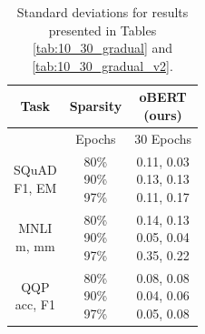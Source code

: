 \documentclass[11pt]{article}
\begin{document}
\begin{table}[htb!]
      \centering
         {\small 
             \begin{tabular}{cc|c}
                \toprule 
                Task & Sparsity & \makecell{oBERT\\ (ours)}\\
                \midrule
                  & Epochs & 30 Epochs\\
                \midrule
                \makecell{SQuAD\\ F1, EM} & \makecell{80\% \\ 90\% \\ 97\%} & \makecell{0.11, 0.03 \\ 0.13, 0.13 \\ 0.11, 0.17}\\
                \midrule
                \makecell{MNLI\\m, mm} & \makecell{80\% \\ 90\% \\ 97\%} & \makecell{0.14, 0.13 \\ 0.05, 0.04 \\ 0.35, 0.22}\\
                \midrule
                \makecell{QQP\\ acc, F1} &  \makecell{80\% \\ 90\% \\ 97\%} & \makecell{0.08, 0.08 \\ 0.04, 0.06 \\ 0.05, 0.08}\\
                \bottomrule
            \end{tabular}
         }
     \caption{Standard deviations for results presented in Tables \ref{tab:10_30_gradual} and \ref{tab:10_30_gradual_v2}.}
    \label{tab:10_30_gradual_stdev}
\end{table}
\end{document}

